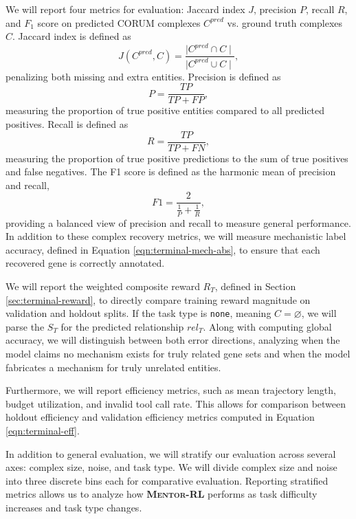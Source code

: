 \documentclass[thesis,letterpaper,12pt]{utthesis}
\begin{document}
We will report four metrics for evaluation: Jaccard index $J$, precision $P$, recall $R$, and $F_1$ score on predicted CORUM complexes $C^{pred}$ vs. ground truth complexes $C$. Jaccard index is defined as 
\[
    J(C^{pred}, C) = \frac{\mid C^{pred} \cap C \mid}{\mid C^{pred} \cup C \mid},
\]
penalizing both missing and extra entities. Precision is defined as
\[
    P = \frac{TP}{TP + FP},
\]
measuring the proportion of true positive entities compared to all predicted positives. Recall is defined as
\[
    R = \frac{TP}{TP + FN},
\]
measuring the proportion of true positive predictions to the sum of true positives and false negatives. The F1 score is defined as the harmonic mean of precision and recall,
\[
    F1 = \frac{2}{\frac{1}{P} + \frac{1}{R}},
\]
providing a balanced view of precision and recall to measure general performance. In addition to these complex recovery metrics, we will measure mechanistic label accuracy, defined in Equation \ref{eqn:terminal-mech-abs}, to ensure that each recovered gene is correctly annotated.

We will report the weighted composite reward $R_T$, defined in Section \ref{sec:terminal-reward}, to directly compare training reward magnitude on validation and holdout splits. If the task type is \texttt{none}, meaning $C = \varnothing$, we will parse the $S_T$ for the predicted relationship $rel_T$. Along with computing global accuracy, we will distinguish between both error directions, analyzing when the model claims no mechanism exists for truly related gene sets and when the model fabricates a mechanism for truly unrelated entities.

Furthermore, we will report efficiency metrics, such as mean trajectory length, budget utilization, and invalid tool call rate. This allows for comparison between holdout efficiency and validation efficiency metrics computed in Equation \ref{eqn:terminal-eff}.

In addition to general evaluation, we will stratify our evaluation across several axes: complex size, noise, and task type. We will divide complex size and noise into three discrete bins each for comparative evaluation. Reporting stratified metrics allows us to analyze how \textbf{\textsc{Mentor-RL}} performs as task difficulty increases and task type changes.
\end{document}
